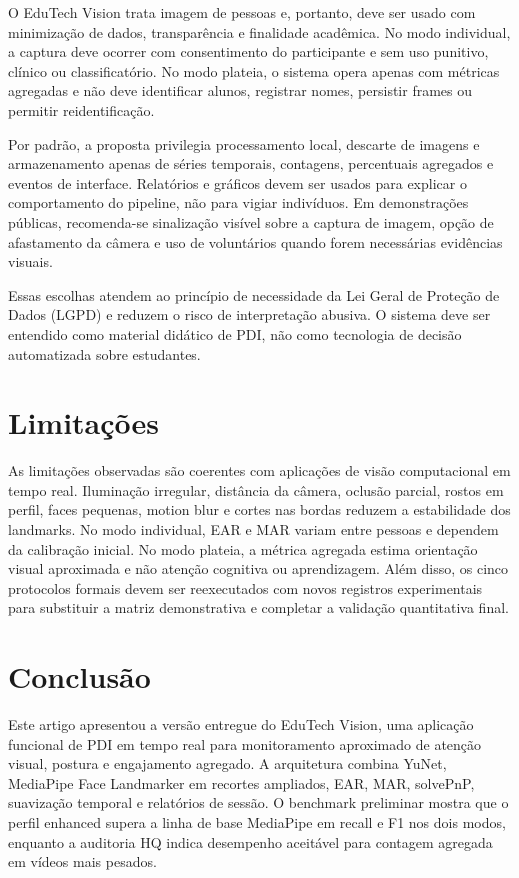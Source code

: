 \documentclass[12pt]{article}
\begin{document}
O EduTech Vision trata imagem de pessoas e, portanto, deve ser usado com minimização de dados, transparência e finalidade acadêmica. No modo individual, a captura deve ocorrer com consentimento do participante e sem uso punitivo, clínico ou classificatório. No modo plateia, o sistema opera apenas com métricas agregadas e não deve identificar alunos, registrar nomes, persistir frames ou permitir reidentificação.

Por padrão, a proposta privilegia processamento local, descarte de imagens e armazenamento apenas de séries temporais, contagens, percentuais agregados e eventos de interface. Relatórios e gráficos devem ser usados para explicar o comportamento do pipeline, não para vigiar indivíduos. Em demonstrações públicas, recomenda-se sinalização visível sobre a captura de imagem, opção de afastamento da câmera e uso de voluntários quando forem necessárias evidências visuais.

Essas escolhas atendem ao princípio de necessidade da Lei Geral de Proteção de Dados (LGPD) \cite{brasil2018} e reduzem o risco de interpretação abusiva. O sistema deve ser entendido como material didático de PDI, não como tecnologia de decisão automatizada sobre estudantes.

\section{Limitações}

As limitações observadas são coerentes com aplicações de visão computacional em tempo real. Iluminação irregular, distância da câmera, oclusão parcial, rostos em perfil, faces pequenas, motion blur e cortes nas bordas reduzem a estabilidade dos landmarks. No modo individual, EAR e MAR variam entre pessoas e dependem da calibração inicial. No modo plateia, a métrica agregada estima orientação visual aproximada e não atenção cognitiva ou aprendizagem. Além disso, os cinco protocolos formais devem ser reexecutados com novos registros experimentais para substituir a matriz demonstrativa e completar a validação quantitativa final.

\section{Conclusão}

Este artigo apresentou a versão entregue do EduTech Vision, uma aplicação funcional de PDI em tempo real para monitoramento aproximado de atenção visual, postura e engajamento agregado. A arquitetura combina YuNet, MediaPipe Face Landmarker em recortes ampliados, EAR, MAR, solvePnP, suavização temporal e relatórios de sessão. O benchmark preliminar mostra que o perfil enhanced supera a linha de base MediaPipe em recall e F1 nos dois modos, enquanto a auditoria HQ indica desempenho aceitável para contagem agregada em vídeos mais pesados.
\end{document}
